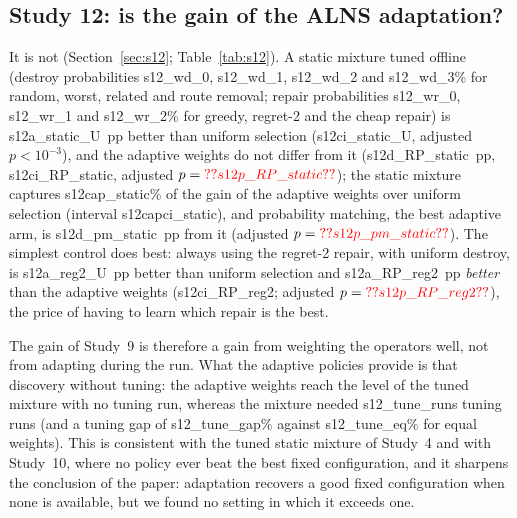 \subsection{Study 12: is the gain of the ALNS adaptation?}\label{sec:s12res}
It is not (Section~\ref{sec:s12}; Table~\ref{tab:s12}). A static mixture tuned offline (destroy probabilities \num{s12_wd_0}, \num{s12_wd_1}, \num{s12_wd_2} and \num{s12_wd_3}\% for random, worst, related and route removal; repair probabilities \num{s12_wr_0}, \num{s12_wr_1} and \num{s12_wr_2}\% for greedy, regret-2 and the cheap repair) is \num{s12a_static_U}~pp better than uniform selection (\num{s12ci_static_U}, adjusted $p<10^{-3}$), and the adaptive weights do not differ from it (\num{s12d_RP_static}~pp, \num{s12ci_RP_static}, adjusted $p=\num{s12p_RP_static}$); the static mixture captures \num{s12cap_static}\% of the gain of the adaptive weights over uniform selection (interval \num{s12capci_static}), and probability matching, the best adaptive arm, is \num{s12d_pm_static}~pp from it (adjusted $p=\num{s12p_pm_static}$). The simplest control does best: always using the regret-2 repair, with uniform destroy, is \num{s12a_reg2_U}~pp better than uniform selection and \num{s12a_RP_reg2}~pp \emph{better} than the adaptive weights (\num{s12ci_RP_reg2}; adjusted $p=\num{s12p_RP_reg2}$), the price of having to learn which repair is the best.



The gain of Study~9 is therefore a gain from weighting the operators well, not from adapting during the run. What the adaptive policies provide is that discovery without tuning: the adaptive weights reach the level of the tuned mixture with no tuning run, whereas the mixture needed \num{s12_tune_runs} tuning runs (and a tuning gap of \num{s12_tune_gap}\% against \num{s12_tune_eq}\% for equal weights). This is consistent with the tuned static mixture of Study~4 and with Study~10, where no policy ever beat the best fixed configuration, and it sharpens the conclusion of the paper: adaptation recovers a good fixed configuration when none is available, but we found no setting in which it exceeds one.

